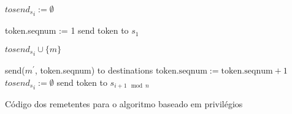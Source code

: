 \begin{algorithm}
\DontPrintSemicolon
{}

${{tosend}_s}_{i} := \emptyset$\;

 {
  token.seqnum := 1\;
  send token to $s_1$\;
}

 {
  ${{tosend}_s}_{i} \cup \{m\}$\;
}

 {
   {
    send(${m}^{\prime}$, token.seqnum) to destinations\;
    $\text{token.seqnum} := \text{token.seqnum} + 1$\;
  }
  ${{tosend}_s}_{i} := \emptyset$\;
  send token to ${s}_{i+1 \mod n}$
}
\caption{Código dos remetentes para o algoritmo baseado em privilégios}
\label{algo:priviledge-based-simple-senders}
\end{algorithm}
